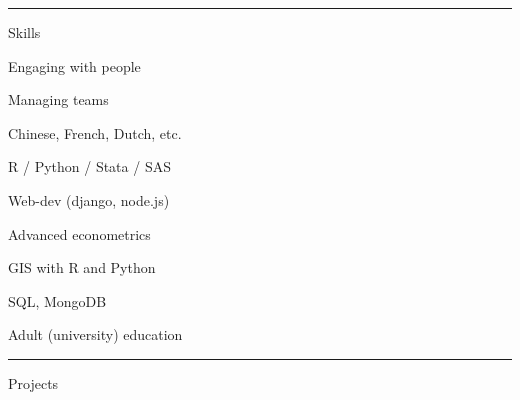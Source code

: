 \documentclass[letterpaper, english, 11pt]{article}
\newenvironment{packed_itemize}{
	\begin{itemize}
		\setlength{\itemsep}{1pt}
		\setlength{\parskip}{2pt}
		\setlength{\parsep}{2pt}
	} {\end{itemize}
}
\begin{document}
\hrule
 
Skills

\begin{footnotesize}
\begin{multicols}{3}
	\begin{packed_itemize}
		\item Engaging with people
		\item Managing teams
		\item Chinese, French, Dutch, etc.
		\item R / Python / Stata / SAS
		\item Web-dev (django, node.js)
		\item Advanced econometrics
		\item GIS with R and Python
		\item SQL, MongoDB
		\item Adult (university) education

	\end{packed_itemize}
\end{multicols}
\end{footnotesize}
\vspace{2pt}
\hrule

Projects
\end{document}
